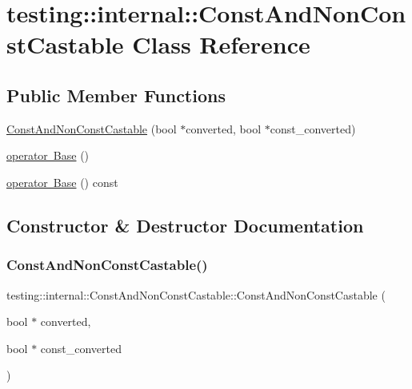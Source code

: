 \hypertarget{classtesting_1_1internal_1_1ConstAndNonConstCastable}{}\section{testing\+::internal\+::Const\+And\+Non\+Const\+Castable Class Reference}
\label{classtesting_1_1internal_1_1ConstAndNonConstCastable}
\subsection*{Public Member Functions}
\begin{DoxyCompactItemize}
\item 
\mbox{\hyperlink{classtesting_1_1internal_1_1ConstAndNonConstCastable_aebe0ef6897b7f805e227bb969d4ee034}{Const\+And\+Non\+Const\+Castable}} (bool $\ast$converted, bool $\ast$const\+\_\+converted)
\item 
\mbox{\hyperlink{classtesting_1_1internal_1_1ConstAndNonConstCastable_aff0c372d429d76d002bb29f83f2429fa}{operator Base}} ()
\item 
\mbox{\hyperlink{classtesting_1_1internal_1_1ConstAndNonConstCastable_a4e8ee8051162f1dfc1da294c71481e2f}{operator Base}} () const
\end{DoxyCompactItemize}


\subsection{Constructor \& Destructor Documentation}
\mbox{\label{classtesting_1_1internal_1_1ConstAndNonConstCastable_aebe0ef6897b7f805e227bb969d4ee034}} 
\subsubsection{\texorpdfstring{ConstAndNonConstCastable()}{ConstAndNonConstCastable()}}
{\footnotesize\ttfamily testing\+::internal\+::\+Const\+And\+Non\+Const\+Castable\+::\+Const\+And\+Non\+Const\+Castable (\begin{DoxyParamCaption}\item[{bool $\ast$}]{converted,  }\item[{bool $\ast$}]{const\+\_\+converted }\end{DoxyParamCaption})\hspace{0.3cm}{\ttfamily [inline]}}



